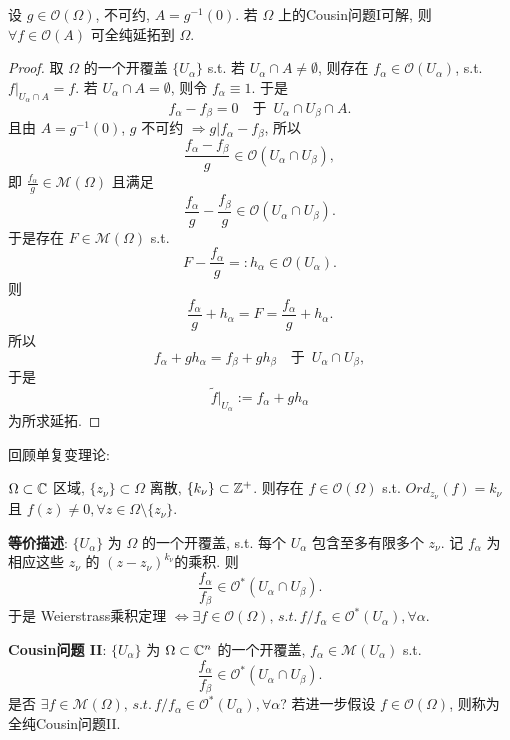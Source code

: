 \begin{theorem}
  设 $g \in \mathcal{O}(\Omega )$, 不可约, $A=g^{-1}(0)$. 若 $\Omega $ 上的Cousin问题I可解, 则 $\forall f \in \mathcal{O}(A)$ 可全纯延拓到 $\Omega $.     
\end{theorem}
\begin{proof}
  取 $\Omega $ 的一个开覆盖 $\{U_{\alpha }\}$ s.t. 若 $U_{\alpha } \cap A \neq \emptyset $,  则存在 $f_{\alpha } \in \mathcal{O}(U_{\alpha })$, s.t. $f|_{U_{\alpha }\cap A}=f$. 若 $U_{\alpha } \cap A = \emptyset $, 则令 $f_{\alpha } \equiv 1$. 
  于是 
  $$ f_{\alpha }-f_{\beta }=0 \quad \text{于 } \, U_{\alpha }\cap U_{\beta }\cap A . $$        
  且由 $A=g^{-1}(0)$, $g $ 不可约 $\Rightarrow g|f_{\alpha }-f_{\beta }$, 所以 
  $$ \frac{f_{\alpha }-f_{\beta }}{g} \in \mathcal{O}(U_{\alpha }\cap U_{\beta }),$$   
  即 $\frac{f_{\alpha }}{g}\in \mathcal{M}(\Omega )$ 且满足 
  $$ \frac{f_{\alpha }}{g}-\frac{f_{\beta }}{g} \in \mathcal{O}(U_{\alpha }\cap U_{\beta }). $$ 
  于是存在 $F \in \mathcal{M}(\Omega )$ s.t. 
  $$ F-\frac{f_{\alpha }}{g}=:h_{\alpha } \in \mathcal{O}(U_{\alpha }). $$ 
  则 
  $$ \frac{f_{\alpha }}{g}+h_{\alpha }=F= \frac{f_{\alpha }}{g}+h_{\alpha }.$$
  所以 
  $$ f_{\alpha }+g h_{\alpha }=  f_{\beta  }+g h_{\beta  } \quad \text{于 }\, U_{\alpha }\cap U_{\beta },$$
  于是 
  $$ \tilde{f}|_{U_{\alpha }}:= f_{\alpha }+g h_{\alpha }$$
  为所求延拓.
\end{proof}

回顾单复变理论: 
\begin{theorem}[Weierstrass乘积定理]
  $\Omega \subset {\mathbb C}$ 区域, $\{z_{\nu }\} \subset \Omega $ 离散, $\{k_{\nu }\} \subset {\mathbb Z}^{+}$. 则存在 $f \in \mathcal{O}(\Omega )$ s.t. $Ord_{z_{\nu }}(f)=k_{\nu }$ 且 $f(z) \neq 0, \forall z \in \Omega \setminus \{z_{\nu }\}$.      
\end{theorem}
\textbf{等价描述}: $\{U_{\alpha }\}$ 为 $\Omega $ 的一个开覆盖, s.t. 每个 $U_{\alpha }$   包含至多有限多个 $z_{\nu }$.   
记 $f_{\alpha }$ 为相应这些 $z_{\nu }$ 的 $(z-z_{\nu })^{k_{\nu }}$的乘积.   
则 
$$ \frac{f_{\alpha}}{f_{\beta }} \in \mathcal{O}^{*}(U_{\alpha }\cap U_{\beta }) .$$
于是
Weierstrass乘积定理 $\Leftrightarrow \exists f \in \mathcal{O}(\Omega ), \, s.t.\, f/f_{\alpha } \in \mathcal{O}^{*}(U_{\alpha }),  \forall \alpha $. 

\noindent\textbf{Cousin问题 II}: 
$\{U_{\alpha }\}$ 为 $\Omega \subset {\mathbb C}^n $ 的一个开覆盖, $f_{\alpha }\in \mathcal{M}(U_{\alpha })$  s.t.  
$$ \frac{f_{\alpha}}{f_{\beta }} \in \mathcal{O}^{*}(U_{\alpha }\cap U_{\beta }) .$$
是否 $\exists f \in \mathcal{M}(\Omega ), \, s.t.\, f/f_{\alpha } \in \mathcal{O}^{*}(U_{\alpha }),  \forall \alpha $?
若进一步假设 $ f \in \mathcal{O}(\Omega )$, 则称为全纯Cousin问题II.  


